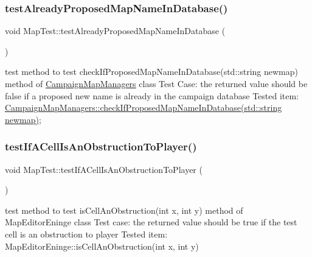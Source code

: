 \subsubsection{\texorpdfstring{test\+Already\+Proposed\+Map\+Name\+In\+Database()}{testAlreadyProposedMapNameInDatabase()}}
{\footnotesize\ttfamily void Map\+Test\+::test\+Already\+Proposed\+Map\+Name\+In\+Database (\begin{DoxyParamCaption}{ }\end{DoxyParamCaption})\hspace{0.3cm}{\ttfamily [protected]}}

test method to test check\+If\+Proposed\+Map\+Name\+In\+Database(std\+::string newmap) method of \hyperlink{class_campaign_map_managers}{Campaign\+Map\+Managers} class Test Case\+: the returned value should be false if a proposed new name is already in the campaign database Tested item\+: \hyperlink{class_campaign_map_managers_a6e04b8ac8bbc2872bb0441428e0042b3}{Campaign\+Map\+Managers\+::check\+If\+Proposed\+Map\+Name\+In\+Database(std\+::string newmap)}; \hypertarget{class_map_test_ad1ed8e9db8609f3e45f8a6a0a17b4ec0}{}\label{class_map_test_ad1ed8e9db8609f3e45f8a6a0a17b4ec0} 
\subsubsection{\texorpdfstring{test\+If\+A\+Cell\+Is\+An\+Obstruction\+To\+Player()}{testIfACellIsAnObstructionToPlayer()}}
{\footnotesize\ttfamily void Map\+Test\+::test\+If\+A\+Cell\+Is\+An\+Obstruction\+To\+Player (\begin{DoxyParamCaption}{ }\end{DoxyParamCaption})\hspace{0.3cm}{\ttfamily [protected]}}

test method to test is\+Cell\+An\+Obstruction(int x, int y) method of Map\+Editor\+Eninge class Test case\+: the returned value should be true if the test cell is an obstruction to player Tested item\+: Map\+Editor\+Eninge\+::is\+Cell\+An\+Obstruction(int x, int y) \hypertarget{class_map_test_ac82274fe5fff0c9eea7425f49a55bfb5}{}\label{class_map_test_ac82274fe5fff0c9eea7425f49a55bfb5} 
